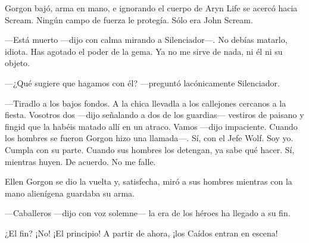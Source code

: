 Gorgon bajó, arma en mano, e ignorando el cuerpo de Aryn Life se acercó hacia Scream. Ningún campo de fuerza le protegía. Sólo era John Scream.

---Está muerto ---dijo con calma mirando a Silenciador---. No debías matarlo, idiota. Has agotado el poder de la gema. Ya no me sirve de nada, ni él ni su objeto.

---¿Qué sugiere que hagamos con él? ---preguntó lacónicamente Silenciador.

---Tiradlo a los bajos fondos. A la chica llevadla a los callejones cercanos a la fiesta. Vosotros dos ---dijo señalando a dos de los guardias--- vestiros de paisano y fingid que la habéis matado allí en un atraco. Vamos ---dijo impaciente. Cuando los hombres se fueron Gorgon hizo una llamada---. Sí, con el Jefe Wolf. Soy yo. Cumpla con su parte. Cuando sus hombres los detengan, ya sabe qué hacer. Sí, mientras huyen. De acuerdo. No me falle.

Ellen Gorgon se dio la vuelta y, satisfecha, miró a sus hombres mientras con la mano alienígena guardaba su arma.

---Caballeros ---dijo con voz solemne--- la era de los héroes ha llegado a su fin.

\begin{next}
    ¿El fin? ¡No! ¡El principio! A partir de ahora, ¡los Caídos entran en escena!
\end{next}

\endinput
